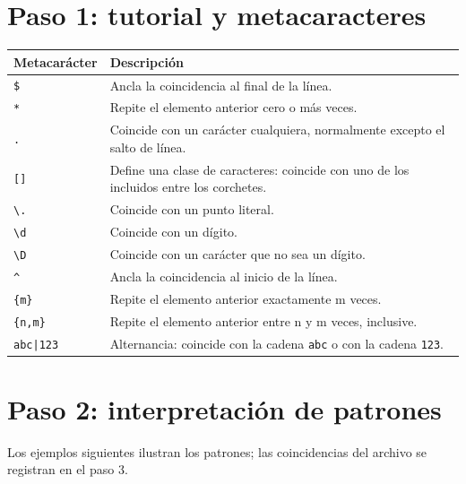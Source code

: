\documentclass[12pt,a4paper]{article}
\begin{document}
\section{Paso 1: tutorial y metacaracteres}

\begingroup
\small
\renewcommand{\arraystretch}{1.35}
\begin{tabular}{@{}p{3cm}>{\RaggedRight\arraybackslash}p{12cm}@{}}
\toprule
\textbf{Metacarácter} & \textbf{Descripción} \\
\midrule
\verb|$| & Ancla la coincidencia al final de la línea. \\
\verb|*| & Repite el elemento anterior cero o más veces. \\
\verb|.| & Coincide con un carácter cualquiera, normalmente excepto el salto de línea. \\
\verb|[]| & Define una clase de caracteres: coincide con uno de los incluidos entre los corchetes. \\
\verb|\.| & Coincide con un punto literal. \\
\verb|\d| & Coincide con un dígito. \\
\verb|\D| & Coincide con un carácter que no sea un dígito. \\
\verb|^| & Ancla la coincidencia al inicio de la línea. \\
\verb|{m}| & Repite el elemento anterior exactamente m veces. \\
\verb|{n,m}| & Repite el elemento anterior entre n y m veces, inclusive. \\
\verb!abc|123! & Alternancia: coincide con la cadena \texttt{abc} o con la cadena \texttt{123}. \\
\bottomrule
\end{tabular}
\endgroup

\newpage
\section{Paso 2: interpretación de patrones}
Los ejemplos siguientes ilustran los patrones; las coincidencias del archivo
se registran en el paso 3.
\end{document}
